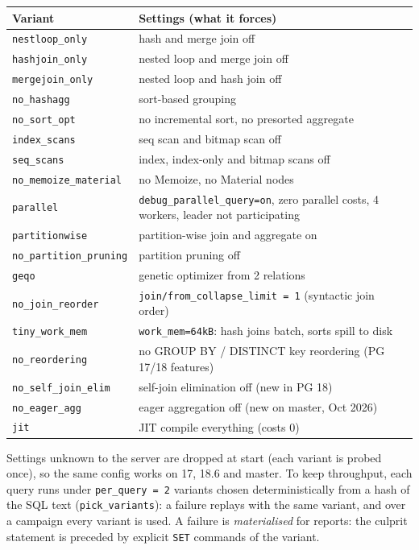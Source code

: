 \begin{center}
\small
\begin{tabularx}{\linewidth}{lX}
\toprule
Variant & Settings (what it forces) \\
\midrule
\texttt{nestloop\_only} & hash and merge join off \\
\texttt{hashjoin\_only} & nested loop and merge join off \\
\texttt{mergejoin\_only} & nested loop and hash join off \\
\texttt{no\_hashagg} & sort-based grouping \\
\texttt{no\_sort\_opt} & no incremental sort, no presorted aggregate \\
\texttt{index\_scans} & seq scan and bitmap scan off \\
\texttt{seq\_scans} & index, index-only and bitmap scans off \\
\texttt{no\_memoize\_material} & no Memoize, no Material nodes \\
\texttt{parallel} & \texttt{debug\_parallel\_query=on}, zero parallel costs, 4 workers, leader not participating \\
\texttt{partitionwise} & partition-wise join and aggregate on \\
\texttt{no\_partition\_pruning} & partition pruning off \\
\texttt{geqo} & genetic optimizer from 2 relations \\
\texttt{no\_join\_reorder} & \texttt{join/from\_collapse\_limit = 1} (syntactic join order) \\
\texttt{tiny\_work\_mem} & \texttt{work\_mem=64kB}: hash joins batch, sorts spill to disk \\
\texttt{no\_reordering} & no GROUP BY / DISTINCT key reordering (PG 17/18 features) \\
\texttt{no\_self\_join\_elim} & self-join elimination off (new in PG 18) \\
\texttt{no\_eager\_agg} & eager aggregation off (new on master, Oct 2026) \\
\texttt{jit} & JIT compile everything (costs 0) \\
\bottomrule
\end{tabularx}
\end{center}

Settings unknown to the server are dropped at start (each variant is probed
once), so the same config works on 17, 18.6 and master. To keep throughput,
each query runs under \texttt{per\_query = 2} variants chosen
deterministically from a hash of the SQL text (\texttt{pick\_variants}): a
failure replays with the same variant, and over a campaign every variant is
used. A failure is \emph{materialised} for reports: the culprit statement is
preceded by explicit \texttt{SET} commands of the variant.


